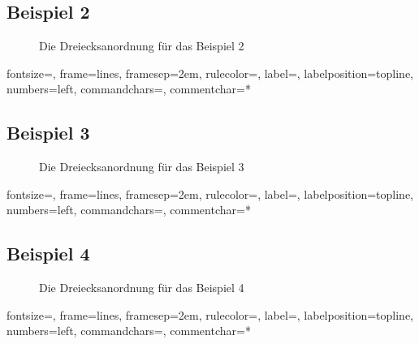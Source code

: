 \documentclass[a4paper, notitlepage, 12pt]{scrartcl}
\begin{document}
\subsection{Beispiel 2}
\begin{figure}[H] 
	
	\caption{Die Dreiecksanordnung für das Beispiel 2}
\end{figure}
%
{fontsize=\footnotesize,
	frame=lines,  %
	framesep=2em, %
	rulecolor=\color{Gray},
	label=,
	labelposition=topline,
	numbers=left,
	commandchars=\|\(\), %
	commentchar=*        %
}
\subsection{Beispiel 3}
\begin{figure}[H] 
	
	\caption{Die Dreiecksanordnung für das Beispiel 3}
\end{figure}
%
{fontsize=\footnotesize,
	frame=lines,  %
	framesep=2em, %
	rulecolor=\color{Gray},
	label=,
	labelposition=topline,
	numbers=left,
	commandchars=\|\(\), %
	commentchar=*        %
}
\subsection{Beispiel 4}
\begin{figure}[H] 
	
	\caption{Die Dreiecksanordnung für das Beispiel 4}
\end{figure}
%
{fontsize=\footnotesize,
	frame=lines,  %
	framesep=2em, %
	rulecolor=\color{Gray},
	label=,
	labelposition=topline,
	numbers=left,
	commandchars=\|\(\), %
	commentchar=*        %
}
\end{document}
